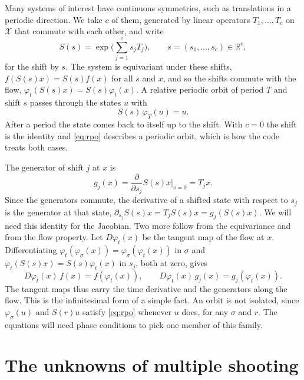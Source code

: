 \documentclass[11pt,a4paper]{article}
\newcommand{\X}{\mathcal{X}}
\newcommand{\R}{\mathbb{R}}
\begin{document}
Many systems of interest have continuous symmetries, such as translations in a periodic direction.
We take $c$ of them, generated by linear operators $T_1, \dots, T_c$ on $\X$ that commute with each
other, and write
\begin{equation}
  S(s) = \exp\Big(\sum_{j=1}^c s_j T_j\Big), \qquad s = (s_1, \dots, s_c) \in \R^c,
\end{equation}
for the shift by $s$. The system is equivariant under these shifts, $f(S(s)x) = S(s)f(x)$ for all
$s$ and $x$, and so the shifts commute with the flow, $\varphi_t(S(s)x) = S(s)\varphi_t(x)$. A
relative periodic orbit of period $T$ and shift $s$ passes through the states $u$ with
\begin{equation}
  S(s)\,\varphi_T(u) = u.
  \label{eq:rpo}
\end{equation}
After a period the state comes back to itself up to the shift. With $c = 0$ the shift is the
identity and \eqref{eq:rpo} describes a periodic orbit, which is how the code treats both cases.

The generator of shift $j$ at $x$ is
\begin{equation}
  g_j(x) = \frac{\partial}{\partial s_j} S(s)x \Big|_{s = 0} = T_j x .
\end{equation}
Since the generators commute, the derivative of a shifted state with respect to $s_j$ is the
generator at that state, $\partial_{s_j} S(s)x = T_j S(s)x = g_j(S(s)x)$. We will need this
identity for the Jacobian. Two more follow from the equivariance and from the flow property. Let
$D\varphi_t(x)$ be the tangent map of the flow at $x$. Differentiating $\varphi_t(\varphi_\sigma(x))
= \varphi_\sigma(\varphi_t(x))$ in $\sigma$ and $\varphi_t(S(s)x) = S(s)\varphi_t(x)$ in $s_j$, both
at zero, gives
\begin{equation}
  D\varphi_t(x)\, f(x) = f(\varphi_t(x)), \qquad D\varphi_t(x)\, g_j(x) = g_j(\varphi_t(x)).
  \label{eq:neutral}
\end{equation}
The tangent maps thus carry the time derivative and the generators along the flow. This is the
infinitesimal form of a simple fact. An orbit is not isolated, since $\varphi_\sigma(u)$ and
$S(r)u$ satisfy \eqref{eq:rpo} whenever $u$ does, for any $\sigma$ and $r$. The equations will
need phase conditions to pick one member of this family.

\section{The unknowns of multiple shooting}
\label{sec:unknowns}
\end{document}
